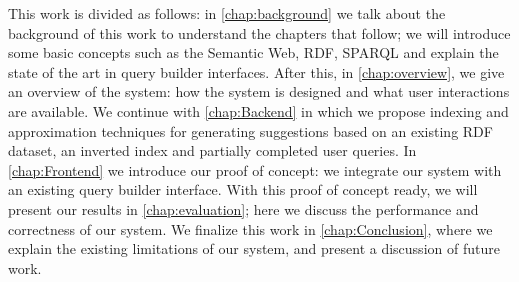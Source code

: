 This work is divided as follows: in \autoref{chap:background} we talk about the background of this work to understand the chapters that follow; we will introduce some basic concepts such as the Semantic Web, RDF, SPARQL and explain the state of the art in query builder interfaces. After this, in \autoref{chap:overview}, we give an overview of the system: how the system is designed and what user interactions are available. We continue with \autoref{chap:Backend} in which we propose indexing and approximation techniques for generating suggestions based on an existing RDF dataset, an inverted index and partially completed user queries. In \autoref{chap:Frontend} we introduce our proof of concept: we integrate our system with an existing query builder interface. With this proof of concept ready, we will present our results in \autoref{chap:evaluation}; here we discuss the performance and correctness of our system. We finalize this work in \autoref{chap:Conclusion}, where we explain the existing limitations of our system, and present a discussion of future work.